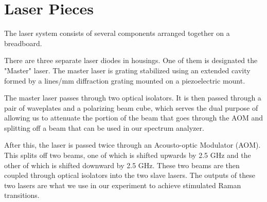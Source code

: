 \chapter{Laser Pieces}

The laser system consists of several components arranged together on a breadboard. 

There are three separate laser diodes in housings. One of them is designated the "Master" laser. The master laser is grating stabilized using an extended cavity formed by a  %
lines/mm diffraction grating mounted on a piezoelectric mount.  

The master laser passes through two optical isolators. It is then passed through a pair of waveplates and a polarizing beam cube, which serves the dual purpose of allowing us to attenuate the portion of the beam that goes through the AOM and splitting off a beam that can be used in our spectrum analyzer. 

After this, the laser is passed twice through an Acousto-optic Modulator (AOM). This splits off two beams, one of which is shifted upwards by 2.5 GHz and the other of which is shifted downward by 2.5 GHz. These two beams are then coupled through optical isolators into the two slave lasers. The outputs of these two lasers are what we use in our experiment to achieve stimulated Raman transitions. 


